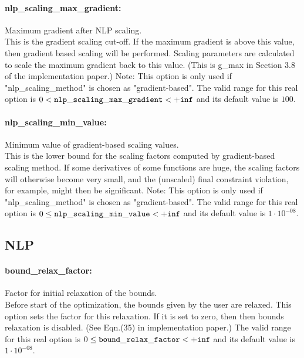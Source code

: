 \paragraph{nlp\_scaling\_max\_gradient:}\label{opt:nlp_scaling_max_gradient} Maximum gradient after NLP scaling. \\
 This is the gradient scaling cut-off. If the
maximum gradient is above this value, then
gradient based scaling will be performed. Scaling
parameters are calculated to scale the maximum
gradient back to this value. (This is g\_max in
Section 3.8 of the implementation paper.) Note:
This option is only used if
"nlp\_scaling\_method" is chosen as
"gradient-based". The valid range for this real option is 
$0 <  {\tt nlp\_scaling\_max\_gradient } <  {\tt +inf}$
and its default value is $100$.


\paragraph{nlp\_scaling\_min\_value:}\label{opt:nlp_scaling_min_value} Minimum value of gradient-based scaling values. \\
 This is the lower bound for the scaling factors
computed by gradient-based scaling method.  If
some derivatives of some functions are huge, the
scaling factors will otherwise become very small,
and the (unscaled) final constraint violation,
for example, might then be significant.  Note:
This option is only used if
"nlp\_scaling\_method" is chosen as
"gradient-based". The valid range for this real option is 
$0 \le {\tt nlp\_scaling\_min\_value } <  {\tt +inf}$
and its default value is $1 \cdot 10^{-08}$.


\subsection{NLP}

\paragraph{bound\_relax\_factor:}\label{opt:bound_relax_factor} Factor for initial relaxation of the bounds. \\
 Before start of the optimization, the bounds
given by the user are relaxed.  This option sets
the factor for this relaxation.  If it is set to
zero, then then bounds relaxation is disabled.
(See Eqn.(35) in implementation paper.) The valid range for this real option is 
$0 \le {\tt bound\_relax\_factor } <  {\tt +inf}$
and its default value is $1 \cdot 10^{-08}$.


